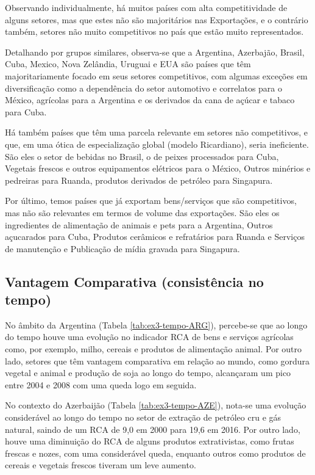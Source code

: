 Observando individualmente, há muitos países com alta competitividade de alguns setores, mas que estes não são majoritários nas Exportações, e o contrário também, setores não muito competitivos no país que estão muito representados.

Detalhando por grupos similares, observa-se que a Argentina, Azerbajão, Brasil, Cuba, Mexico, Nova Zelândia, Uruguai e EUA são países que têm majoritariamente focado em seus setores competitivos, com algumas exceções em diversificação como a dependência do setor automotivo e correlatos para o México, agrícolas para a Argentina e os derivados da cana de açúcar e tabaco para Cuba.

Há também países que têm uma parcela relevante em setores não competitivos, e que, em uma ótica de especialização global (modelo Ricardiano), seria ineficiente. São eles o setor de bebidas no Brasil, o de peixes processados para Cuba, Vegetais frescos e outros equipamentos elétricos para o México, Outros minérios e pedreiras para Ruanda, produtos derivados de petróleo para Singapura.

Por último, temos países que já exportam bens/serviços que são competitivos, mas não são relevantes em termos de volume das exportações. São eles os ingredientes de alimentação de animais e pets para a Argentina, Outros açucarados para Cuba, Produtos cerâmicos e refratários para Ruanda e Serviços de manutenção e Publicação de mídia gravada para  Singapura.

\subsection{Vantagem Comparativa (consistência no tempo)}

No âmbito da Argentina (Tabela \ref{tab:ex3-tempo-ARG}), percebe-se que ao longo do tempo houve uma evolução no indicador RCA de bens e serviços agrícolas como, por exemplo, milho, cereais e produtos de alimentação animal. Por outro lado, setores que têm vantagem comparativa em relação ao mundo, como gordura vegetal e animal e produção de soja ao longo do tempo, alcançaram um pico entre 2004 e 2008 com uma queda logo em seguida.

No contexto do Azerbaijão (Tabela \ref{tab:ex3-tempo-AZE}), nota-se uma evolução considerável ao longo do tempo no setor de extração de petróleo cru e gás natural, saindo de um RCA de 9,0 em 2000 para 19,6 em 2016. Por outro lado, houve uma diminuição do RCA de alguns produtos extrativistas, como frutas frescas e nozes, com uma considerável queda, enquanto outros como produtos de cereais e vegetais frescos tiveram um leve aumento.

